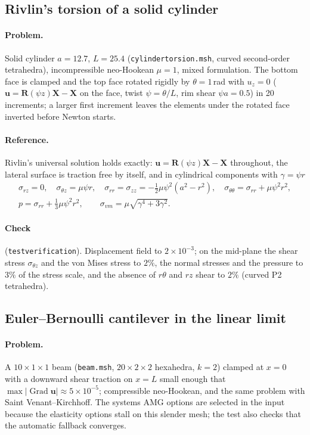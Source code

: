 \documentclass[11pt]{article}
\newcommand{\Grad}{\operatorname{Grad}}
\newcommand{\bX}{\bm{X}}
\newcommand{\bu}{\bm{u}}
\newcommand{\bR}{\bm{R}}
\DeclareRobustCommand{\file}[1]{{\def\_{\textunderscore\allowbreak}\texttt{#1}}}
\begin{document}
\subsection{Rivlin's torsion of a solid cylinder}

\paragraph{Problem.}
Solid cylinder $a = 12.7$, $L = 25.4$ (\file{cylinder\_torsion.msh}, curved
second-order tetrahedra), incompressible neo-Hookean $\mu = 1$, mixed
formulation.  The bottom face is clamped and the top face rotated rigidly
by $\theta = 1$\,rad with $u_z = 0$ ($\bu = \bR(\psi z)\bX - \bX$ on the
face, twist $\psi = \theta/L$, rim shear $\psi a = 0.5$) in 20 increments; a
larger first increment leaves the elements under the rotated face inverted
before Newton starts.

\paragraph{Reference.}
Rivlin's universal solution holds exactly: $\bu = \bR(\psi z)\bX - \bX$
throughout, the lateral surface is traction free by itself, and in
cylindrical components with $\gamma = \psi r$
\begin{gather}
  \sigma_{rz} = 0, \quad \sigma_{\theta z} = \mu\psi r, \quad
  \sigma_{rr} = \sigma_{zz} = -\tfrac12\mu\psi^2(a^2 - r^2), \quad
  \sigma_{\theta\theta} = \sigma_{rr} + \mu\psi^2r^2, \\
  p = \sigma_{rr} + \tfrac13\mu\psi^2r^2, \qquad
  \sigma_{vm} = \mu\sqrt{\gamma^4 + 3\gamma^2}.
\end{gather}

\paragraph{Check} (\file{test\_verification}).  Displacement field to
$2\times10^{-3}$; on the mid-plane the shear stress $\sigma_{\theta z}$
and the von Mises stress to $2\%$, the normal stresses and the pressure to
$3\%$ of the stress scale, and the absence of $r\theta$ and $rz$ shear to
$2\%$ (curved P2 tetrahedra).

\subsection{Euler--Bernoulli cantilever in the linear limit}

\paragraph{Problem.}
A $10\times1\times1$ beam (\file{beam.msh}, $20\times2\times2$ hexahedra,
$k = 2$) clamped at $x = 0$ with a downward shear traction on $x = L$ small
enough that $\max|\Grad\bu| \approx 5\times10^{-5}$; compressible
neo-Hookean, and the same problem with Saint Venant--Kirchhoff.  The
systems AMG options are selected in the input because the elasticity
options stall on this slender mesh; the test also checks that the
automatic fallback converges.
\end{document}
